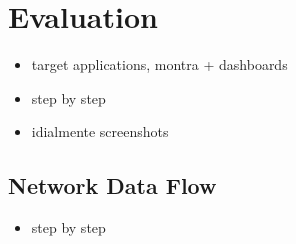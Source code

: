 \chapter{Evaluation}
\label{chapter:evaluation}

\begin{itemize}
    \item target applications, montra + dashboards
    \item step by step
    \item idialmente screenshots
\end{itemize}

\section{Network Data Flow}
\begin{itemize}
    \item step by step
\end{itemize}
